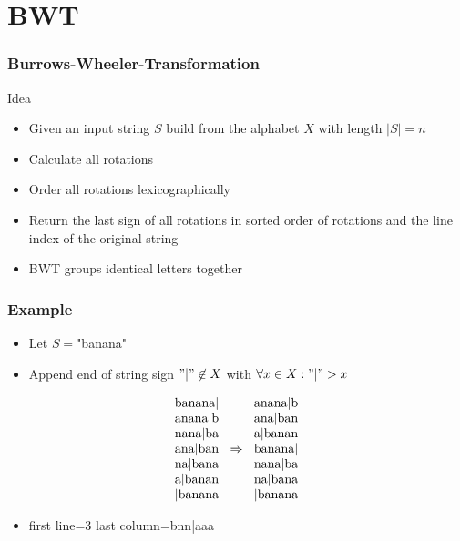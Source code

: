 \section{BWT}

\begin{frame}
	\frametitle{Burrows-Wheeler-Transformation}
	\begin{block}{Idea}
		\begin{itemize}
			\item Given an input string $S$ build from the alphabet $X$ with length $|S|=n$
			\item Calculate all rotations
			\item Order all rotations lexicographically
			\item Return the last sign of all rotations in sorted order of rotations and the line index of the original string
		\end{itemize}
	\end{block}
	\begin{itemize}
		\item BWT groups identical letters together
	\end{itemize}
\end{frame}

\begin{frame}
	\frametitle{Example}
	\begin{itemize}
		\item Let $S=$"banana"
		\item Append end of string sign $"|"\not \in X$ with $\forall x\in X:"|" > x$
	\end{itemize}

	\begin{displaymath}
		\begin{tabular}{c}
		banana|\\
		anana|b\\
		nana|ba\\
		ana|ban\\
		na|bana\\
		a|banan\\
		|banana
		\end{tabular}
		\Rightarrow
		\begin{tabular}{c}
		anana|b\\
		ana|ban\\
		a|banan\\
		banana|\\
		nana|ba\\
		na|bana\\
		|banana
		\end{tabular}
	\end{displaymath}
	\begin{itemize}
		\item first line=3 last column=bnn|aaa
	\end{itemize}	
\end{frame}

